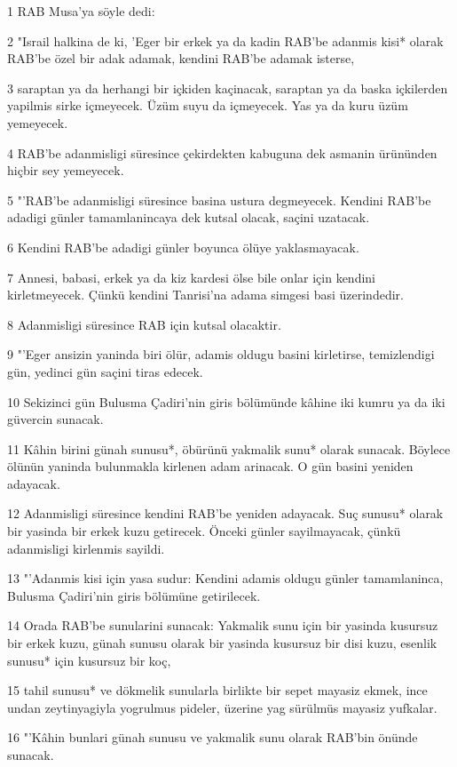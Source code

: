 \par 1 RAB Musa'ya söyle dedi:
\par 2 "Israil halkina de ki, 'Eger bir erkek ya da kadin RAB'be adanmis kisi* olarak RAB'be özel bir adak adamak, kendini RAB'be adamak isterse,
\par 3 saraptan ya da herhangi bir içkiden kaçinacak, saraptan ya da baska içkilerden yapilmis sirke içmeyecek. Üzüm suyu da içmeyecek. Yas ya da kuru üzüm yemeyecek.
\par 4 RAB'be adanmisligi süresince çekirdekten kabuguna dek asmanin ürününden hiçbir sey yemeyecek.
\par 5 "'RAB'be adanmisligi süresince basina ustura degmeyecek. Kendini RAB'be adadigi günler tamamlanincaya dek kutsal olacak, saçini uzatacak.
\par 6 Kendini RAB'be adadigi günler boyunca ölüye yaklasmayacak.
\par 7 Annesi, babasi, erkek ya da kiz kardesi ölse bile onlar için kendini kirletmeyecek. Çünkü kendini Tanrisi'na adama simgesi basi üzerindedir.
\par 8 Adanmisligi süresince RAB için kutsal olacaktir.
\par 9 "'Eger ansizin yaninda biri ölür, adamis oldugu basini kirletirse, temizlendigi gün, yedinci gün saçini tiras edecek.
\par 10 Sekizinci gün Bulusma Çadiri'nin giris bölümünde kâhine iki kumru ya da iki güvercin sunacak.
\par 11 Kâhin birini günah sunusu*, öbürünü yakmalik sunu* olarak sunacak. Böylece ölünün yaninda bulunmakla kirlenen adam arinacak. O gün basini yeniden adayacak.
\par 12 Adanmisligi süresince kendini RAB'be yeniden adayacak. Suç sunusu* olarak bir yasinda bir erkek kuzu getirecek. Önceki günler sayilmayacak, çünkü adanmisligi kirlenmis sayildi.
\par 13 "'Adanmis kisi için yasa sudur: Kendini adamis oldugu günler tamamlaninca, Bulusma Çadiri'nin giris bölümüne getirilecek.
\par 14 Orada RAB'be sunularini sunacak: Yakmalik sunu için bir yasinda kusursuz bir erkek kuzu, günah sunusu olarak bir yasinda kusursuz bir disi kuzu, esenlik sunusu* için kusursuz bir koç,
\par 15 tahil sunusu* ve dökmelik sunularla birlikte bir sepet mayasiz ekmek, ince undan zeytinyagiyla yogrulmus pideler, üzerine yag sürülmüs mayasiz yufkalar.
\par 16 "'Kâhin bunlari günah sunusu ve yakmalik sunu olarak RAB'bin önünde sunacak.
